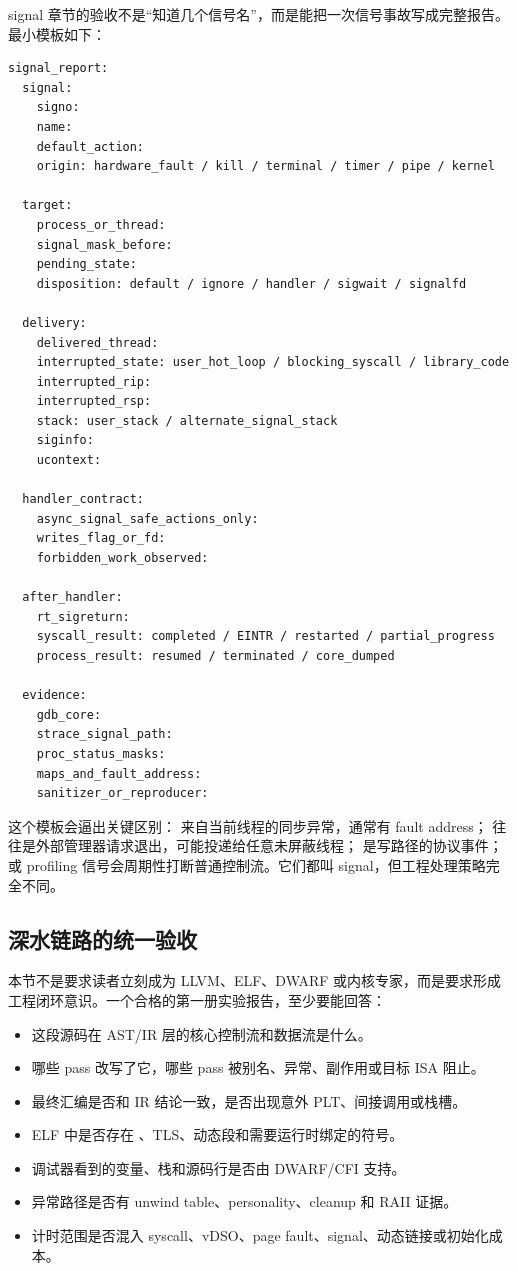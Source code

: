 signal 章节的验收不是“知道几个信号名”，而是能把一次信号事故写成完整报告。最小模板如下：

\begin{lstlisting}[numbers=none,caption={signal 事故报告模板}]
signal_report:
  signal:
    signo:
    name:
    default_action:
    origin: hardware_fault / kill / terminal / timer / pipe / kernel

  target:
    process_or_thread:
    signal_mask_before:
    pending_state:
    disposition: default / ignore / handler / sigwait / signalfd

  delivery:
    delivered_thread:
    interrupted_state: user_hot_loop / blocking_syscall / library_code
    interrupted_rip:
    interrupted_rsp:
    stack: user_stack / alternate_signal_stack
    siginfo:
    ucontext:

  handler_contract:
    async_signal_safe_actions_only:
    writes_flag_or_fd:
    forbidden_work_observed:

  after_handler:
    rt_sigreturn:
    syscall_result: completed / EINTR / restarted / partial_progress
    process_result: resumed / terminated / core_dumped

  evidence:
    gdb_core:
    strace_signal_path:
    proc_status_masks:
    maps_and_fault_address:
    sanitizer_or_reproducer:
\end{lstlisting}

这个模板会逼出关键区别： 来自当前线程的同步异常，通常有 fault address； 往往是外部管理器请求退出，可能投递给任意未屏蔽线程； 是写路径的协议事件； 或 profiling 信号会周期性打断普通控制流。它们都叫 signal，但工程处理策略完全不同。

\subsection{深水链路的统一验收}

本节不是要求读者立刻成为 LLVM、ELF、DWARF 或内核专家，而是要求形成工程闭环意识。一个合格的第一册实验报告，至少要能回答：

\begin{itemize}
  \item 这段源码在 AST/IR 层的核心控制流和数据流是什么。
  \item 哪些 pass 改写了它，哪些 pass 被别名、异常、副作用或目标 ISA 阻止。
  \item 最终汇编是否和 IR 结论一致，是否出现意外 PLT、间接调用或栈槽。
  \item ELF 中是否存在 、TLS、动态段和需要运行时绑定的符号。
  \item 调试器看到的变量、栈和源码行是否由 DWARF/CFI 支持。
  \item 异常路径是否有 unwind table、personality、cleanup 和 RAII 证据。
  \item 计时范围是否混入 syscall、vDSO、page fault、signal、动态链接或初始化成本。
\end{itemize}

